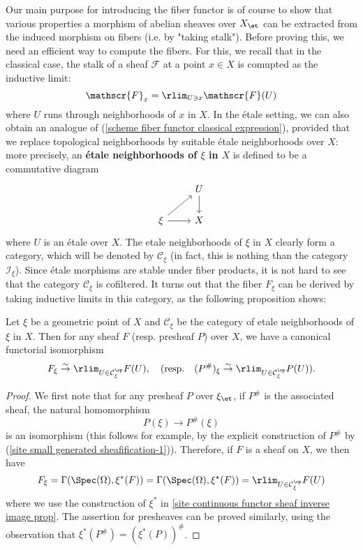 Our main purpose for introducing the fiber functor is of course to show that various properties a morphism of abelian sheaves over $X_\et$ can be extracted from the induced morphism on fibers (i.e. by "taking stalk"). Before proving this, we need an efficient way to compute the fibers. For this, we recall that in the classical case, the stalk of a sheaf $\mathscr{F}$ at a point $x\in X$ is comupted as the inductive limit:
\begin{equation}\label{scheme fiber functor classical expression}
\mathscr{F}_x=\rlim_{U\ni x}\mathscr{F}(U)
\end{equation}
where $U$ runs through neighborhoods of $x$ in $X$. In the \'etale setting, we can also obtain an analogue of (\ref{scheme fiber functor classical expression}), provided that we replace topological neighborhoods by suitable \'etale neighborhoods over $X$: more precisely, an \textbf{\'etale neighborhoods of $\xi$ in $X$} is defined to be a commutative diagram
\[\begin{tikzcd}
&U\ar[d]\\
\xi\ar[ru]\ar[r]&X
\end{tikzcd}\]
where $U$ is an \'etale over $X$. The etale neighborhoods of $\xi$ in $X$ clearly form a category, which will be denoted by $\mathcal{C}_\xi$ (in fact, this is nothing than the category $\mathcal{I}_\xi$). Since \'etale morphisms are stable under fiber products, it is not hard to see that the category $\mathcal{C}_\xi$ is cofiltered. It turns out that the fiber $F_\xi$ can be derived by taking inductive limits in this category, as the following proposition shows:
\begin{proposition}\label{scheme etale site fiber functor expression}
Let $\xi$ be a geometric point of $X$ and $\mathcal{C}_\xi$ be the category of etale neighborhoods of $\xi$ in $X$. Then for any sheaf $F$ (resp. presheaf $P$) over $X$, we have a canonical functorial isomorphism
\begin{equation}\label{scheme etale site fiber functor expression-1}
F_\xi \stackrel{\sim}{\to} \rlim_{U\in\mathcal{C}_\xi^{\op}} F(U),\quad 
(\text{resp.}\quad (P^\#)_\xi \stackrel{\sim}{\to} \rlim_{U\in\mathcal{C}_\xi^{\op}} P(U)).
\end{equation}
\end{proposition}
\begin{proof}
We first note that for any presheaf $P$ over $\xi_\et$, if $P^\#$ is the associated sheaf, the natural homomorphism
\[P(\xi)\to P^\#(\xi)\]
is an isomorphism (this follows for example, by the explicit construction of $P^\#$ by (\ref{site small generated sheafification-1})). Therefore, if $F$ is a sheaf on $X$, we then have
\[F_\xi=\Gamma(\Spec(\Omega),\xi^*(F))=\Gamma(\Spec(\Omega),\xi^\star(F))=\rlim_{U\in\mathcal{C}_\xi^{\op}}F(U)\]
where we use the construction of $\xi^*$ in \cref{site continuous functor sheaf inverse image prop}. The assertion for presheaves can be proved similarly, using the observation that $\xi^*(P^\#)=(\xi^*(P))^\#$.
\end{proof}


